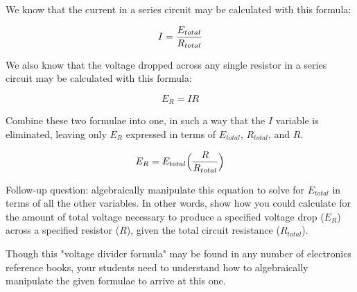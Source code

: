

We know that the current in a series circuit may be calculated with this formula:

$$I = {E_{total} \over R_{total}}$$

We also know that the voltage dropped across any single resistor in a series circuit may be calculated with this formula:

$$E_R = I R$$

Combine these two formulae into one, in such a way that the $I$ variable is eliminated, leaving only $E_R$ expressed in terms of $E_{total}$, $R_{total}$, and $R$.







$$E_R = E_{total} \Bigl({R \over R_{total}}\Bigr)$$

\vskip 10pt

Follow-up question: algebraically manipulate this equation to solve for $E_{total}$ in terms of all the other variables.  In other words, show how you could calculate for the amount of total voltage necessary to produce a specified voltage drop ($E_R$) across a specified resistor ($R$), given the total circuit resistance ($R_{total}$).







Though this "voltage divider formula" may be found in any number of electronics reference books, your students need to understand how to algebraically manipulate the given formulae to arrive at this one.




